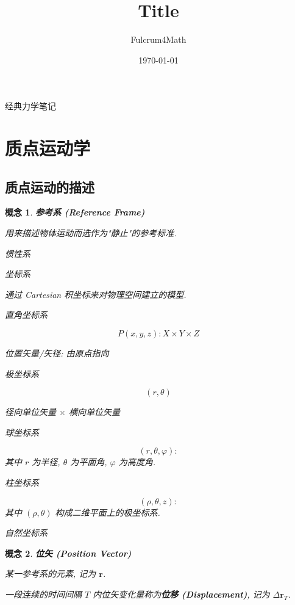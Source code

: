 \documentclass[UTF8]{ctexart}
\title{Title}
\author{Fulcrum4Math}
\date{\today}
\newcommand{\<}{\langle}
\renewcommand{\>}{\rangle}                              %
\newenvironment{dfn_box}{
    \begin{tcolorbox}[enhanced, colback=dfn_green2, boxrule=0pt, frame hidden,
        borderline west={0.7mm}{0.1mm}{dfn_green1},breakable]
    }
    {\end{tcolorbox}}
\theoremstyle{MyStyle} %
\newtheorem{definition}{概念}[subsection]
\newenvironment{cpt}{\begin{dfn_box}\begin{definition}}{\end{definition}\end{dfn_box}}
\begin{document}
\begin{center}
    {\LARGE 经典力学笔记}
\end{center}

\section{质点运动学}

    \subsection{质点运动的描述}
        
        \begin{cpt}
            \textbf{参考系 (Reference Frame)}

            用来描述物体运动而选作为"静止"的参考标准. 
        
            惯性系
        
            坐标系
        
                通过 Cartesian 积坐标来对物理空间建立的模型. 
        
                直角坐标系
        
                    $$P(x,y,z) : X\times Y\times Z$$
        
                    位置矢量/矢径: 由原点指向
        
                极坐标系
        
                    $$(r,\theta)$$
        
                    径向单位矢量 $\times$ 横向单位矢量
                
                球坐标系
        
                    $$(r,\theta,\varphi) : $$
                    其中 $r$ 为半径, $\theta$ 为平面角, $\varphi$ 为高度角. 
        
                柱坐标系
        
                    $$(\rho,\theta,z) : $$
                    其中 $(\rho,\theta)$ 构成二维平面上的极坐标系. 
        
                自然坐标系
        \end{cpt}
        
        \begin{cpt}
            \textbf{位矢 (Position Vector)}

            某一参考系的元素, 记为 \(\bm{r}\). 

            一段连续的时间间隔 \(T\) 内位矢变化量称为\textbf{位移 (Displacement)}, 记为 \(\Delta\bm{r}_T\). 
        \end{cpt}
        
\end{document}
